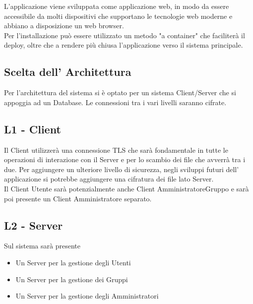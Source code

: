 L'applicazione viene sviluppata come applicazione web, in modo da essere accessibile da molti dispositivi che supportano le tecnologie web moderne e abbiano a disposizione un web browser.
\\
Per l'installazione può essere utilizzato un metodo "a container" che faciliterà il deploy, oltre che a rendere più chiusa l'applicazione verso il sistema principale.

\vspace{0.5cm}

\pagebreak
{}
\subsection*{Scelta dell' Architettura}
Per l'architettura del sistema si è optato per un sistema Client/Server che si appoggia ad un Database. Le connessioni tra i vari livelli saranno cifrate.
\vspace{0.5cm}
\subsection*{L1 - Client}
Il Client utilizzerà una connessione TLS che sarà fondamentale in tutte le operazioni di interazione con il Server e per lo scambio dei file che avverrà tra i due.
Per aggiungere un ulteriore livello di sicurezza, negli sviluppi futuri dell' applicazione si potrebbe aggiungere una cifratura dei file lato Server.
\\
Il Client Utente sarà potenzialmente anche Client AmministratoreGruppo e sarà poi presente un Client Amministratore separato.
\vspace{0.5cm}

\subsection*{L2 - Server}
\vspace{0.5cm}
Sul sistema sarà presente
\begin{itemize}
\item Un Server per la gestione degli Utenti
\item Un Server per la gestione dei Gruppi
\item Un Server per la gestione degli Amministratori
\end{itemize}
